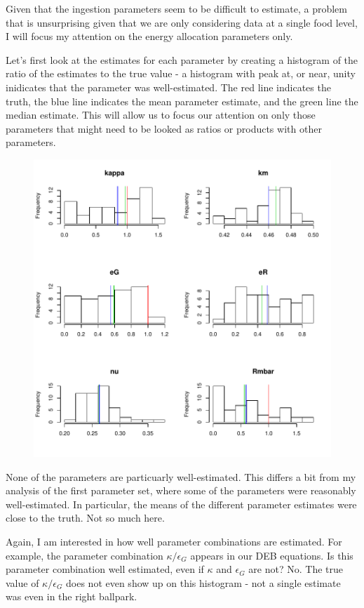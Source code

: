 \documentclass[12pt,reqno,final]{amsart}
\theoremstyle{plain}
\numberwithin{equation}{part}
\begin{document}
Given that the ingestion parameters seem to be difficult to estimate,
a problem that is unsurprising given that we are only considering data
at a single food level, I will focus my attention on the energy
allocation parameters only.

Let's first look at the estimates for each parameter by creating a
histogram of the ratio of the estimates to the true value - a
histogram with peak at, or near, unity inidicates that the parameter
was well-estimated. The red line indicates the truth, the blue line
indicates the mean parameter estimate, and the green line the median
estimate. This will allow us to focus our attention on only those
parameters that might need to be looked as ratios or products with
other parameters.
\begin{figure}
\includegraphics{Solving_the_problem_of_parameter_covariation_4-003}
\end{figure}

None of the parameters are particuarly well-estimated. This differs a
bit from my analysis of the first parameter set, where some of the
parameters were reasonably well-estimated. In particular, the means of
the different parameter estimates were close to the truth. Not so much
here.

Again, I am interested in how well parameter combinations are
estimated. For example, the parameter combination $\kappa/\epsilon_G$
appears in our DEB equations. Is this parameter combination well
estimated, even if $\kappa$ and $\epsilon_G$ are not? No. The true
value of $\kappa/\epsilon_G$ does not even show up on this histogram -
not a single estimate was even in the right ballpark.
\end{document}
